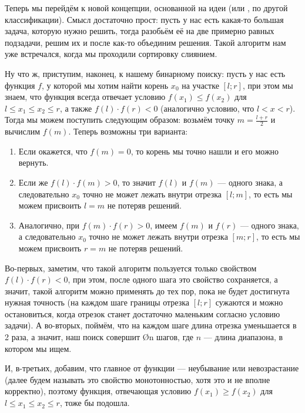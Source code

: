 Теперь мы перейдём к новой концепции, основанной на идеи  (или , по другой классификации). Смысл достаточно прост: пусть у нас есть какая-то большая задача, которую нужно решить, тогда разобьём её на две примерно равных подзадачи, решим их и после как-то объединим решения. Такой алгоритм нам уже встречался, когда мы проходили сортировку слиянием.

Ну что ж, приступим, наконец, к нашему бинарному поиску: пусть у нас есть функция $f$, у которой мы хотим найти корень $x_0$ на участке $[l;r]$, при этом мы знаем, что функция всегда отвечает условию $f(x_1) \leq f(x_2)$ для $l \leq x_1 \leq x_2 \leq r$, а также $f(l) \cdot f(r) < 0$ (аналогично условию, что $l < x < r$). Тогда мы можем поступить следующим образом: возьмём точку $m = \frac{l + r}{2}$ и вычислим $f(m)$. Теперь возможны три варианта:

\begin{enumerate}
    \item Если окажется, что $f(m) = 0$, то корень мы точно нашли и его можно вернуть.
    \item Если же $f(l) \cdot f(m) > 0$, то значит $f(l)$ и $f(m)$ — одного знака, а следовательно $x_0$ точно не может лежать внутри отрезка $[l;m]$, то есть мы можем присвоить $l = m$ не потеряв решений.
    \item Аналогично, при $f(m) \cdot f(r) > 0$, имеем $f(m)$ и $f(r)$ — одного знака, а следовательно $x_0$ точно не может лежать внутри отрезка $[m;r]$, то есть мы можем присвоить $r = m$ не потеряв решений.
\end{enumerate}

Во-первых, заметим, что такой алгоритм пользуется только свойством $f(l) \cdot f(r) < 0$, при этом, после одного шага это свойство сохраняется, а значит, такой алгоритм можно применять до тех пор, пока не будет достигнута нужная точность (на каждом шаге границы отрезка $[l;r]$ сужаются и можно остановиться, когда отрезок станет достаточно маленьким согласно условию задачи). А во-вторых, поймём, что на каждом шаге длина отрезка уменьшается в 2 раза, а значит, наш поиск совершит \O{\log n} шагов, где $n$ — длина диапазона, в котором мы ищем.

И, в-третьих, добавим, что главное от функции — неубывание или невозрастание (далее будем называть это свойство монотонностью, хотя это и не вполне корректно), поэтому функция, отвечающая условию $f(x_1) \geq f(x_2)$ для $l \leq x_1 \leq x_2 \leq r$, тоже бы подошла.


